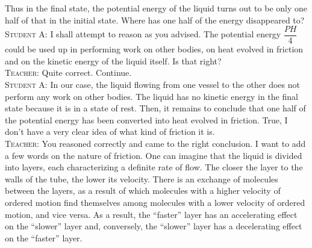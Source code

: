 \documentclass[a4paper,sfsidenotes]{tufte-book}
\begin{document}
Thus in the final state, the potential energy of the liquid turns out to be only one half of that in the
initial state. Where has one half of the energy disappeared to?
\\
\textsc{Student A:} I shall attempt to reason as you advised. The potential energy $\dfrac{PH}{4} $ could be used up in performing work on other bodies, on heat evolved in friction and on the kinetic energy of the liquid itself. Is that right?
\\
\textsc{Teacher:} Quite correct. Continue.
\\
\textsc{Student A:} In our case, the liquid flowing from one vessel to the other does not perform any work on other bodies. The liquid has no kinetic energy in the final state because it is in a state of rest. Then, it remains to conclude that one half of the potential energy has been converted into heat
evolved in friction. True, I don't have a very clear idea of what kind of friction it is.
\\
\textsc{Teacher:} You reasoned correctly and came to the right conclusion. I want to add a few words on the nature of friction. One can imagine that the liquid is divided into layers, each characterizing a definite rate of flow. The closer the layer to the walls of the tube, the lower its velocity. There is an exchange of molecules between the layers, as a result of which molecules with a higher velocity of ordered motion find themselves among molecules with a lower velocity of ordered
motion, and vice versa. As a result, the ``faster'' layer has an accelerating effect on the ``slower'' layer and, conversely, the ``slower'' layer has a decelerating effect on the ``faster'' layer.
\end{document}
